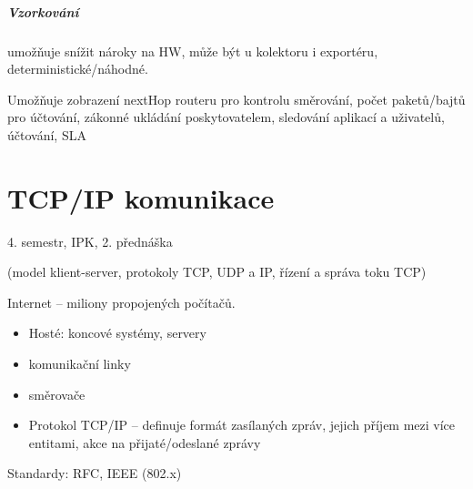 \documentclass[a4paper, 11pt]{report}
\begin{document}
\paragraph{Vzorkování}
umožňuje snížit nároky na HW, může být u kolektoru i exportéru, deterministické/náhodné.

Umožňuje zobrazení nextHop routeru pro kontrolu směrování, počet paketů/bajtů pro účtování, zákonné ukládání poskytovatelem, sledování aplikací a uživatelů, účtování, SLA






























\chapter{TCP/IP komunikace} \label{cha:39}

4. semestr, IPK, 2. přednáška

(model klient-server, protokoly TCP, UDP a IP, řízení a správa toku TCP)

Internet -- miliony propojených počítačů.
\begin{itemize}
	\item Hosté: koncové systémy, servery
	\item komunikační linky
	\item směrovače
	\item Protokol TCP/IP -- definuje formát zasílaných zpráv, jejich příjem mezi více entitami, akce na přijaté/odeslané zprávy
\end{itemize}

Standardy: RFC, IEEE (802.x)
\end{document}
